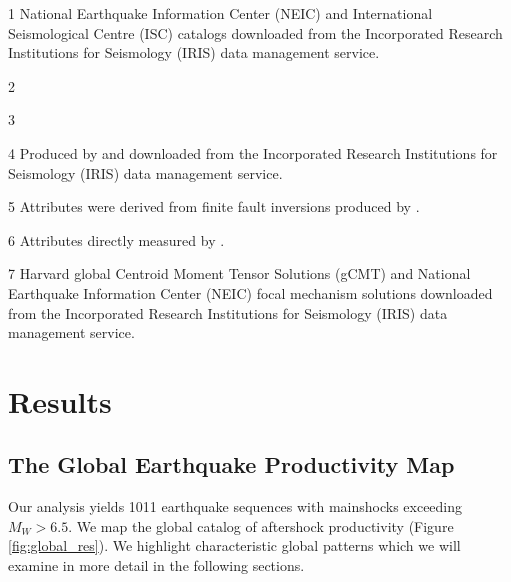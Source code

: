 \documentclass[draft]{agujournal2018}
\begin{document}
\begin{table}[]
\begin{threeparttable}
    \begin{tablenotes}
        \item[1] National Earthquake Information Center (NEIC) and International Seismological Centre (ISC) catalogs downloaded from the Incorporated Research Institutions for Seismology (IRIS) data management service. 
        \item[2] \citet{Bird2003AnBoundaries}
        \item[3] \citet{Muller2008}
        \item[4] Produced by \citet{Convers2011GlobalMid2010} and downloaded from the Incorporated Research Institutions for Seismology (IRIS) data management service.
        \item[5] Attributes were derived from finite fault inversions produced by \citet{Hayes2017}.
        \item[6] Attributes directly measured by \citet{Hayes2017}.
        \item[7] Harvard global Centroid Moment Tensor Solutions (gCMT) and National Earthquake Information Center (NEIC) focal mechanism solutions downloaded from the Incorporated Research Institutions for Seismology (IRIS) data management service.

    \end{tablenotes}

\end{threeparttable}

\end{table}



\section{Results}
    \subsection{The Global Earthquake Productivity Map}\label{sec:glob}
    
    Our analysis yields 1011 earthquake sequences with mainshocks exceeding $M_W>6.5$. We map the global catalog of aftershock productivity (Figure \ref{fig:global_res}). We highlight characteristic global patterns which we will examine in more detail in the following sections.
    
\end{document}
